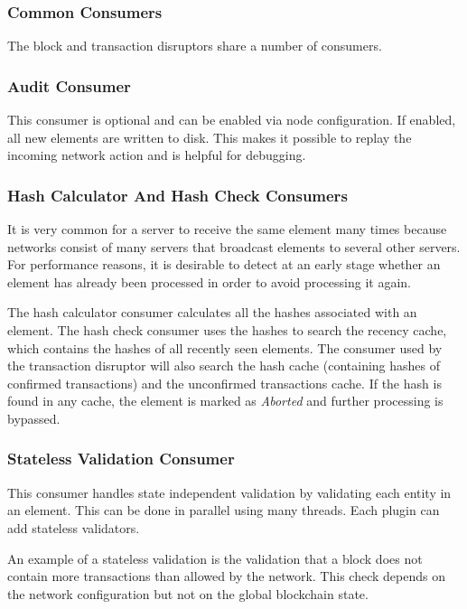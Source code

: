 \subsubsection{Common Consumers}
\label{sec:disruptor:commonConsumers}
The block and transaction disruptors share a number of consumers.

\subsubsection*{Audit Consumer}
This consumer is optional and can be enabled via node configuration.
If enabled, all new elements are written to disk.
This makes it possible to replay the incoming network action and is helpful for debugging.

\subsubsection*{Hash Calculator And Hash Check Consumers}
It is very common for a server to receive the same element many times because networks consist of many servers that broadcast elements to several other servers.
For performance reasons, it is desirable to detect at an early stage whether an element has already been processed in order to avoid processing it again.

The hash calculator consumer calculates all the hashes associated with an element.
The hash check consumer uses the hashes to search the recency cache, which contains the hashes of all recently seen elements.
The consumer used by the transaction disruptor will also search the hash cache (containing hashes of confirmed transactions) and the unconfirmed transactions cache.
If the hash is found in any cache, the element is marked as \textit{Aborted} and further processing is bypassed.

\subsubsection*{Stateless Validation Consumer}
This consumer handles state independent validation by validating each entity in an element.
This can be done in parallel using many threads.
Each plugin can add stateless validators.

An example of a stateless validation is the validation that a block does not contain more transactions than allowed by the network.
This check depends on the network configuration but not on the global blockchain state.

